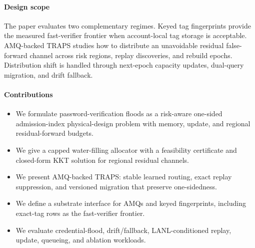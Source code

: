 \paragraph{Design scope}
The paper evaluates two complementary regimes. Keyed tag fingerprints provide the measured fast-verifier frontier when account-local tag storage is acceptable. AMQ-backed TRAPS studies how to distribute an unavoidable residual false-forward channel across risk regions, replay discoveries, and rebuild epochs. Distribution shift is handled through next-epoch capacity updates, dual-query migration, and drift fallback.

\paragraph{Contributions}
\begin{itemize}
    \item We formulate password-verification floods as a risk-aware one-sided admission-index physical-design problem with memory, update, and regional residual-forward budgets.
    \item We give a capped water-filling allocator with a feasibility certificate and closed-form KKT solution for regional residual channels.
    \item We present AMQ-backed TRAPS: stable learned routing, exact replay suppression, and versioned migration that preserve one-sidedness.
    \item We define a substrate interface for AMQs and keyed fingerprints, including exact-tag rows as the fast-verifier frontier.
    \item We evaluate credential-flood, drift/fallback, LANL-conditioned replay, update, queueing, and ablation workloads.
\end{itemize}
